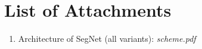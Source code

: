 \chapter*{List of Attachments}
\vspace{7mm}
\begin{enumerate}
\item Architecture of SegNet (all variants): \textit{scheme.pdf}

\end{enumerate}

